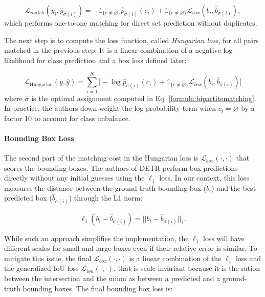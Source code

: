 \begin{equation}
	\label{eq:detr_hungarian}
	\mathcal{L}_{match}(y_i, \hat y_{\sigma(i)}) = -\mathds{1}_{\{c \neq \varnothing\}}\hat p_{\sigma(i)}(c_i) + \mathds{1}_{\{c \neq \varnothing\}}\mathcal{L}_{box}(b_i, \hat b_{\sigma(i)}),
\end{equation}
which performs one-to-one matching for direct set prediction without duplicates. 

The next step is to compute the loss function, called \textit{Hungarian loss}, for all pairs matched in the previous step. It is a linear combination of a negative log-likelihood for class prediction and a box loss defined later:

\begin{equation}
\label{eq:detr_loss}
\mathcal{L}_{\text{Hungarian}}(y, \hat y) = \sum_{i = 1}^{N} \bigg [-\log \hat p_{\hat\sigma(i)}(c_i) + \mathds{1}_{\{c \neq \varnothing\}}\mathcal{L}_{box}(b_i, \hat b_{\hat\sigma(i)}) \bigg ]
\end{equation}
where $\hat \sigma$ is the optimal assignment computed in Eq. \ref{formula:bipartitematching}. In practice, the authors
down-weight the log-probability term when $c_i = \varnothing$ by a factor 10 to account for class imbalance. 

\paragraph{Bounding Box Loss} The second part of the matching cost in the Hungarian loss is $\mathcal{L}_{box}(\cdot, \cdot)$ that scores the bounding boxes. The authors of DETR \cite{detr} perform box predictions directly without any initial guesses using the $\ell_1$ loss. In our context, this loss measures the distance between the  ground-truth bounding box ($b_i$) and the best predicted box ($\hat b_{\sigma(i)}$) through the L1 norm:

\begin{equation}
\ell_1(b_i - \hat b_{\sigma(i)}) = ||b_i - \hat b_{\sigma(i)}||_1.
\end{equation}

While such an approach simplifies the implementation, the $\ell_1$ loss will have different scales for small and large boxes even if their relative error is similar. To mitigate this issue, the final $\mathcal{L}_{box}(\cdot, \cdot)$ is a linear combination of the $\ell_1$ loss and the generalized IoU loss \cite{generalizediou} $\mathcal{L}_{iou}(\cdot, \cdot)$, that is scale-invariant because it is the ration between the intersection and the union as between a predicted and a ground-truth bounding boxes. The final bounding box loss is:

